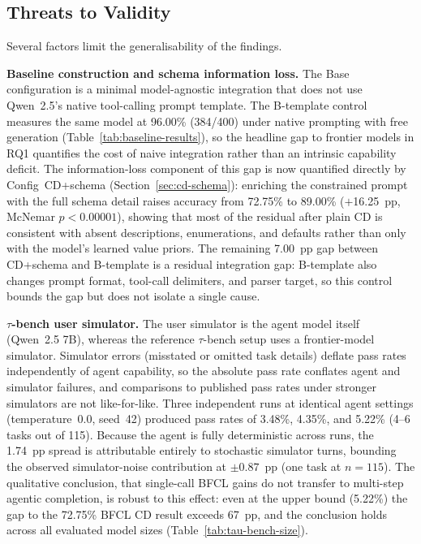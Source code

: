 \subsection{Threats to Validity}
\label{sec:threats-validity}

Several factors limit the generalisability of the findings.

\textbf{Baseline construction and schema information loss.}
The Base configuration is a minimal model-agnostic integration that
does not use Qwen~2.5's native tool-calling prompt template. The
B-template control measures the same model at 96.00\% (384/400) under
native prompting with free generation
(Table~\ref{tab:baseline-results}), so the headline gap to
frontier models in RQ1 quantifies the cost of naive integration
rather than an intrinsic capability deficit. The information-loss
component of this gap is now quantified directly by Config~CD+schema
(Section~\ref{sec:cd-schema}): enriching the constrained prompt
with the full schema detail raises accuracy from 72.75\% to 89.00\%
($+$16.25~pp, McNemar $p < 0.00001$), showing that most of the
residual after plain CD is consistent with absent descriptions,
enumerations, and defaults rather than only with the model's learned value
priors. The remaining 7.00~pp gap between CD+schema and B-template
is a residual integration gap: B-template also changes prompt format,
tool-call delimiters, and parser target, so this control bounds the gap but
does not isolate a single cause.

\textbf{$\tau$-bench user simulator.}
The user simulator is the agent model itself (Qwen~2.5 7B), whereas
the reference $\tau$-bench setup uses a frontier-model simulator.
Simulator errors (misstated or omitted task details) deflate pass
rates independently of agent capability, so the absolute pass rate
conflates agent and simulator failures, and comparisons to published
pass rates under stronger simulators are not like-for-like.
Three independent runs at identical agent settings (temperature~0.0,
seed~42) produced pass rates of 3.48\%, 4.35\%, and 5.22\%
(4--6 tasks out of 115). Because the agent is fully deterministic
across runs, the 1.74~pp spread is attributable entirely to stochastic
simulator turns, bounding the observed simulator-noise contribution at
$\pm 0.87$~pp (one task at $n{=}115$). The qualitative conclusion, that
single-call BFCL gains do not transfer to multi-step agentic
completion, is robust to this effect: even at the upper bound (5.22\%)
the gap to the 72.75\% BFCL CD result exceeds 67~pp, and the
conclusion holds across all evaluated model sizes
(Table~\ref{tab:tau-bench-size}).

